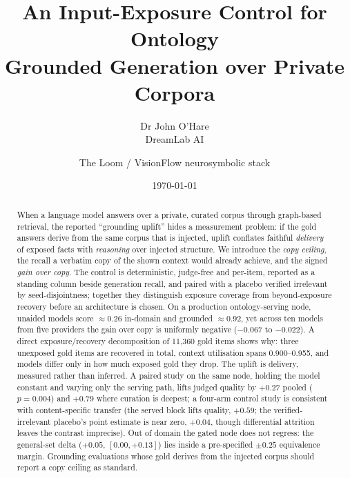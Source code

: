 \documentclass[10pt,twocolumn]{article}
\title{\vspace{-1.2cm}\bfseries An Input-Exposure Control for Ontology\\
Grounded Generation over Private Corpora}
\author{Dr John O'Hare\\ \small DreamLab AI \and \small The Loom / VisionFlow neurosymbolic stack}
\date{\today}
\begin{document}
\maketitle

\begin{abstract}
\noindent
When a language model answers over a private, curated corpus through graph-based retrieval, the
reported ``grounding uplift'' hides a measurement problem: if the gold answers derive from the same
corpus that is injected, uplift conflates faithful \emph{delivery} of exposed facts with
\emph{reasoning} over injected structure. We introduce the \emph{copy ceiling}, the recall a verbatim
copy of the shown context would already achieve, and the signed \emph{gain over copy}. The control is
deterministic, judge-free and per-item, reported as a standing column beside generation recall, and
paired with a placebo verified irrelevant by seed-disjointness; together they distinguish exposure
coverage from beyond-exposure recovery before an architecture is chosen. On a production ontology-serving node, unaided models score
$\approx0.26$ in-domain and grounded $\approx0.92$, yet across ten models from five providers the gain
over copy is uniformly negative ($-0.067$ to $-0.022$). A direct exposure/recovery decomposition of
11{,}360 gold items shows why: three unexposed gold items are recovered in total, context utilisation
spans 0.900--0.955, and models differ only in how much exposed gold they drop. The uplift is delivery,
measured rather than inferred. A paired study on the same node, holding the model constant and varying
only the serving path, lifts judged quality by $+0.27$ pooled ($p=0.004$) and $+0.79$ where curation is
deepest; a four-arm control study is consistent with content-specific transfer (the served block lifts
quality, $+0.59$; the verified-irrelevant placebo's point estimate is near zero, $+0.04$, though
differential attrition leaves the contrast imprecise). Out of domain the gated node does not regress: the
general-set delta ($+0.05$, $[0.00,+0.13]$) lies inside a pre-specified $\pm0.25$ equivalence margin.
Grounding evaluations whose gold derives from the injected corpus should report a copy ceiling as
standard.
\end{abstract}
\end{document}
